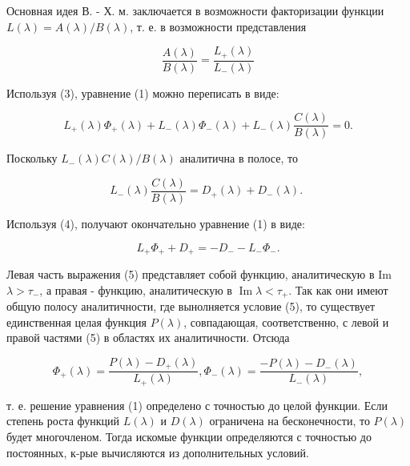 \documentclass[10pt]{article}
\begin{document}
Основная идея В. - Х. м. заключается в возможности факторизации функции $L(\lambda)=A(\lambda) / B(\lambda)$, т. е. в возможности представления



\[

\frac{A(\lambda)}{B(\lambda)}=\frac{L_{+}(\lambda)}{L_{-}(\lambda)}

\]



Используя (3), уравнение (1) можно переписать в виде:



\[

L_{+}(\lambda) \Phi_{+}(\lambda)+L_{-}(\lambda) \Phi_{-}(\lambda)+L_{-}(\lambda) \frac{C(\lambda)}{B(\lambda)}=0 .

\]



Поскольку $L_{-}(\lambda) C(\lambda) / B(\lambda)$ аналитична в полосе, то



\[

L_{-}(\lambda) \frac{C(\lambda)}{B(\lambda)}=D_{+}(\lambda)+D_{-}(\lambda) \text {. }

\]



Используя (4), получают окончательно уравнение (1) в виде:



\[

L_{+} \Phi_{+}+D_{+}=-D_{-}-L_{-} \Phi_{-} .

\]



Левая часть выражения (5) представляет собой функцию, аналитическую в Im $\lambda>\tau_{-}$, а правая - функцию, аналитическую в $\operatorname{Im} \lambda<\tau_{+}$. Так как они имеют общую полосу аналитичности, где вынолняется условие (5), то существует единственная целая функция $P(\lambda)$, совпадающая, соответственно, с левой и правой частями (5) в областях их аналитичности. Отсюда



\[

\Phi_{+}(\lambda)=\frac{P(\lambda)-D_{+}(\lambda)}{L_{+}(\lambda)}, \Phi_{-}(\lambda)=\frac{-P(\lambda)-D_{-}(\lambda)}{L_{-}(\lambda)},

\]



т. е. решение уравнения (1) определено с точностью до целой функции. Если степень роста функций $L(\lambda)$ и $D(\lambda)$ ограничена на бесконечности, то $P(\lambda)$ будет многочленом. Тогда искомые функции определяются с точностью до постоянных, к-рые вычисляются из дополнительных условий.
\end{document}
